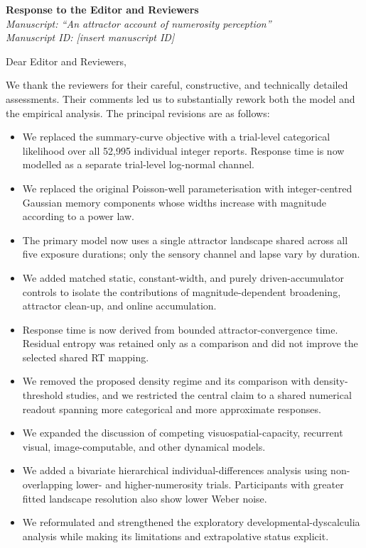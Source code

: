 \documentclass[11pt]{article}
\begin{document}
\begin{center}
{\Large\bfseries Response to the Editor and Reviewers}\\[0.5em]
{\itshape Manuscript: ``An attractor account of numerosity perception''}\\[0.25em]
{\itshape Manuscript ID: [insert manuscript ID]}
\end{center}

Dear Editor and Reviewers,

We thank the reviewers for their careful, constructive, and technically detailed assessments. Their comments led us to substantially rework both the model and the empirical analysis. The principal revisions are as follows:

\begin{itemize}
\item We replaced the summary-curve objective with a trial-level categorical likelihood over all 52,995 individual integer reports. Response time is now modelled as a separate trial-level log-normal channel.
\item We replaced the original Poisson-well parameterisation with integer-centred Gaussian memory components whose widths increase with magnitude according to a power law.
\item The primary model now uses a single attractor landscape shared across all five exposure durations; only the sensory channel and lapse vary by duration.
\item We added matched static, constant-width, and purely driven-accumulator controls to isolate the contributions of magnitude-dependent broadening, attractor clean-up, and online accumulation.
\item Response time is now derived from bounded attractor-convergence time. Residual entropy was retained only as a comparison and did not improve the selected shared RT mapping.
\item We removed the proposed density regime and its comparison with density-threshold studies, and we restricted the central claim to a shared numerical readout spanning more categorical and more approximate responses.
\item We expanded the discussion of competing visuospatial-capacity, recurrent visual, image-computable, and other dynamical models.
\item We added a bivariate hierarchical individual-differences analysis using non-overlapping lower- and higher-numerosity trials. Participants with greater fitted landscape resolution also show lower Weber noise.
\item We reformulated and strengthened the exploratory developmental-dyscalculia analysis while making its limitations and extrapolative status explicit.
\end{itemize}
\end{document}
